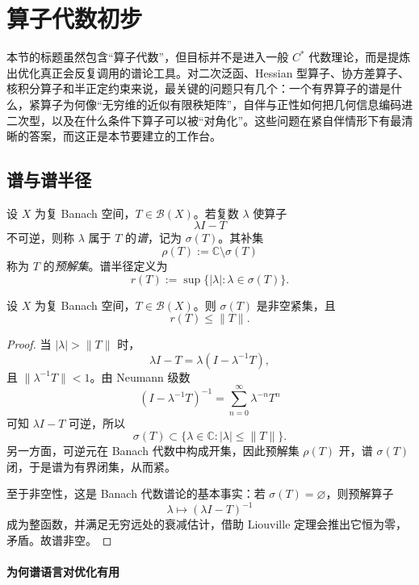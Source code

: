 \section{算子代数初步}

\label{sec:3-4}

本节的标题虽然包含“算子代数”，但目标并不是进入一般 $C^\ast$ 代数理论，而是提炼出优化真正会反复调用的谱论工具。对二次泛函、Hessian 型算子、协方差算子、核积分算子和半正定约束来说，最关键的问题只有几个：一个有界算子的谱是什么，紧算子为何像“无穷维的近似有限秩矩阵”，自伴与正性如何把几何信息编码进二次型，以及在什么条件下算子可以被“对角化”。这些问题在紧自伴情形下有最清晰的答案，而这正是本节要建立的工作台。

\subsection{谱与谱半径}

\begin{definition}[有界算子的谱]\label{def:spectrum-bounded-operator}
设 $X$ 为复 Banach 空间，$T\in \mathcal B(X)$。若复数 $\lambda$ 使算子
\[
\lambda I-T
\]
不可逆，则称 $\lambda$ 属于 $T$ 的\emph{谱}，记为 $\sigma(T)$。其补集
\[
\rho(T):=\mathbb C\setminus \sigma(T)
\]
称为 $T$ 的\emph{预解集}。谱半径定义为
\[
r(T):=\sup\{|\lambda|:\lambda\in \sigma(T)\}.
\]
\end{definition}

\begin{proposition}[谱的基本性质]
设 $X$ 为复 Banach 空间，$T\in \mathcal B(X)$。则 $\sigma(T)$ 是非空紧集，且
\[
r(T)\le \|T\|.
\]
\end{proposition}

\begin{proof}
当 $|\lambda|>\|T\|$ 时，
\[
\lambda I-T=\lambda\left(I-\lambda^{-1}T\right),
\]
且 $\|\lambda^{-1}T\|<1$。由 Neumann 级数
\[
\left(I-\lambda^{-1}T\right)^{-1}
=\sum_{n=0}^{\infty}\lambda^{-n}T^n
\]
可知 $\lambda I-T$ 可逆，所以
\[
\sigma(T)\subset \{\lambda\in \mathbb C:|\lambda|\le \|T\|\}.
\]
另一方面，可逆元在 Banach 代数中构成开集，因此预解集 $\rho(T)$ 开，谱 $\sigma(T)$ 闭，于是谱为有界闭集，从而紧。

至于非空性，这是 Banach 代数谱论的基本事实：若 $\sigma(T)=\varnothing$，则预解算子
\[
\lambda\mapsto (\lambda I-T)^{-1}
\]
成为整函数，并满足无穷远处的衰减估计，借助 Liouville 定理会推出它恒为零，矛盾。故谱非空。
\end{proof}

\paragraph{为何谱语言对优化有用}

